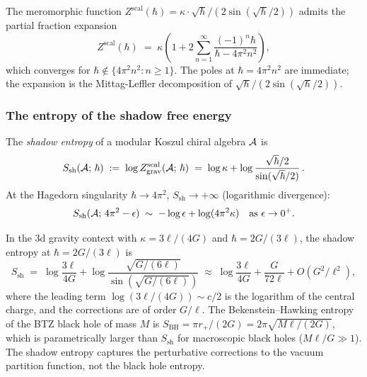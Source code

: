 \begin{remark}
\label{rem:thqg-I-partial-fraction}
The meromorphic function $Z^{\mathrm{scal}}(\hbar) = \kappa \cdot \sqrt{\hbar}/(2\sin(\sqrt{\hbar}/2))$ admits the partial fraction expansion
\begin{equation}\label{eq:thqg-I-partial-fraction}
Z^{\mathrm{scal}}(\hbar) \;=\; \kappa \left( 1 + 2\sum_{n=1}^{\infty} \frac{(-1)^{n} \hbar}{\hbar - 4\pi^2 n^2} \right),
\end{equation}
which converges for $\hbar \notin \{4\pi^2 n^2 : n \geq 1\}$. The poles at $\hbar = 4\pi^2 n^2$ are immediate; the expansion is the Mittag-Leffler decomposition of $\sqrt{\hbar}/(2\sin(\sqrt{\hbar}/2))$.
\end{remark}

\subsubsection{The entropy of the shadow free energy}

\begin{definition}
\label{def:thqg-I-shadow-entropy}
The \emph{shadow entropy} of a modular Koszul chiral algebra $\mathcal{A}$ is
\begin{equation}\label{eq:thqg-I-shadow-entropy}
S_{\mathrm{sh}}(\mathcal{A};\,\hbar) \;:=\; \log Z^{\mathrm{scal}}_{\mathrm{grav}}(\mathcal{A};\,\hbar) \;=\; \log\kappa + \log\frac{\sqrt{\hbar}/2}{\sin(\sqrt{\hbar}/2)}\,.
\end{equation}
At the Hagedorn singularity $\hbar \to 4\pi^2$, $S_{\mathrm{sh}} \to +\infty$ (logarithmic divergence):
\begin{equation}\label{eq:thqg-I-entropy-divergence}
S_{\mathrm{sh}}(\mathcal{A};\,4\pi^2 - \epsilon) \;\sim\; -\log\epsilon + \log(4\pi^2\kappa) \quad\text{as } \epsilon \to 0^+.
\end{equation}
\end{definition}

\begin{remark}
\label{rem:thqg-I-bekenstein-hawking}
In the 3d gravity context with $\kappa = 3\ell/(4G)$ and $\hbar = 2G/(3\ell)$, the shadow entropy at $\hbar = 2G/(3\ell)$ is
\[
S_{\mathrm{sh}} \;=\; \log\frac{3\ell}{4G} + \log\frac{\sqrt{G/(6\ell)}}{\sin(\sqrt{G/(6\ell)})} \;\approx\; \log\frac{3\ell}{4G} + \frac{G}{72\ell} + O(G^2/\ell^2),
\]
where the leading term $\log(3\ell/(4G)) \sim c/2$ is the logarithm of the central charge, and the corrections are of order $G/\ell$. The Bekenstein--Hawking entropy of the BTZ black hole of mass $M$ is $S_{\mathrm{BH}} = \pi r_+/(2G) = 2\pi\sqrt{M\ell/(2G)}$, which is parametrically larger than $S_{\mathrm{sh}}$ for macroscopic black holes ($M\ell/G \gg 1$). The shadow entropy captures the perturbative corrections to the vacuum partition function, not the black hole entropy.
\end{remark}

